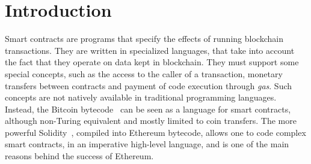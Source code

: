 \section{Introduction}\label{sec:introduction}

Smart contracts are programs that specify the effects of running blockchain transactions.
They are written in specialized languages, that take into account
the fact that they operate on data kept in blockchain. They must
support some special concepts, such as the access to the caller of a transaction,
monetary transfers between contracts
and payment of code execution through \emph{gas}.
Such concepts are not natively available
in traditional programming languages.
Instead, the Bitcoin bytecode~\cite{Antonopoulos17,Nakamoto08}
can be seen as a language for smart contracts,
although non-Turing equivalent and mostly limited to coin transfers. The more
powerful Solidity~\cite{AntonopoulosW18},
compiled into Ethereum bytecode, allows one to code
complex smart contracts, in an imperative high-level language, and is
one of the main reasons behind the success of Ethereum.


